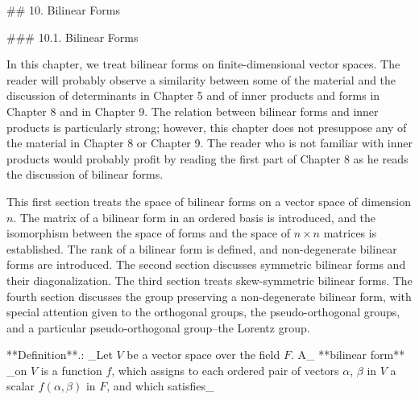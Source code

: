 

## 10. Bilinear Forms

### 10.1. Bilinear Forms

In this chapter, we treat bilinear forms on finite-dimensional vector spaces. The reader will probably observe a similarity between some of the material and the discussion of determinants in Chapter 5 and of inner products and forms in Chapter 8 and in Chapter 9. The relation between bilinear forms and inner products is particularly strong; however, this chapter does not presuppose any of the material in Chapter 8 or Chapter 9. The reader who is not familiar with inner products would probably profit by reading the first part of Chapter 8 as he reads the discussion of bilinear forms.

This first section treats the space of bilinear forms on a vector space of dimension \(n\). The matrix of a bilinear form in an ordered basis is introduced, and the isomorphism between the space of forms and the space of \(n\times n\) matrices is established. The rank of a bilinear form is defined, and non-degenerate bilinear forms are introduced. The second section discusses symmetric bilinear forms and their diagonalization. The third section treats skew-symmetric bilinear forms. The fourth section discusses the group preserving a non-degenerate bilinear form, with special attention given to the orthogonal groups, the pseudo-orthogonal groups, and a particular pseudo-orthogonal group--the Lorentz group.

**Definition**.: _Let \(V\) be a vector space over the field \(F\). A_ **bilinear form** _on \(V\) is a function \(f\), which assigns to each ordered pair of vectors \(\alpha\), \(\beta\) in \(V\) a scalar \(f(\alpha,\beta)\) in \(F\), and which satisfies_